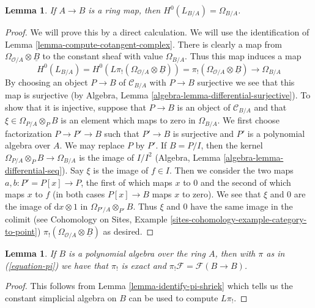 \documentclass[10pt,a4paper]{amsart}
\theoremstyle{plain}
\newtheorem{lemma}[subsection]{Lemma}
\theoremstyle{definition}
\theoremstyle{remark}
\numberwithin{equation}{subsection}
\begin{document}
\begin{lemma}
\label{lemma-identify-H0}
If $A \to B$ is a ring map, then $H^0(L_{B/A}) = \Omega_{B/A}$.
\end{lemma}

\begin{proof}
We will prove this by a direct calculation.
We will use the identification of Lemma \ref{lemma-compute-cotangent-complex}.
There is clearly a map from $\Omega_{\mathcal{O}/A} \otimes \underline{B}$
to the constant sheaf with value $\Omega_{B/A}$. Thus this map induces
a map
$$
H^0(L_{B/A}) = H^0(L\pi_!(\Omega_{\mathcal{O}/A} \otimes \underline{B}))
= \pi_!(\Omega_{\mathcal{O}/A} \otimes \underline{B}) \to \Omega_{B/A}
$$
By choosing an object $P \to B$ of $\mathcal{C}_{B/A}$ with $P \to B$
surjective we see that this map is surjective (by
Algebra, Lemma \ref{algebra-lemma-differential-surjective}).
To show that it is injective, suppose that $P \to B$ is an object
of $\mathcal{C}_{B/A}$ and that $\xi \in \Omega_{P/A} \otimes_P B$
is an element which maps to zero in $\Omega_{B/A}$.
We first choose factorization $P \to P' \to B$ such that $P' \to B$
is surjective and $P'$ is a polynomial algebra over $A$.
We may replace $P$ by $P'$. If $B = P/I$, then the kernel
$\Omega_{P/A} \otimes_P B \to \Omega_{B/A}$ is the image of
$I/I^2$ (Algebra, Lemma \ref{algebra-lemma-differential-seq}).
Say $\xi$ is the image of $f \in I$.
Then we consider the two maps $a, b : P' = P[x] \to P$, the first of which
maps $x$ to $0$ and the second of which maps $x$ to $f$ (in both
cases $P[x] \to B$ maps $x$ to zero). We see that $\xi$ and $0$
are the image of $\text{d}x \otimes 1$ in $\Omega_{P'/A} \otimes_{P'} B$.
Thus $\xi$ and $0$ have the same image in the colimit (see
Cohomology on Sites, Example \ref{sites-cohomology-example-category-to-point})
$\pi_!(\Omega_{\mathcal{O}/A} \otimes \underline{B})$ as desired.
\end{proof}

\begin{lemma}
\label{lemma-pi-lower-shriek-polynomial-algebra}
If $B$ is a polynomial algebra over the ring $A$, then
with $\pi$ as in (\ref{equation-pi}) we have that
$\pi_!$ is exact and $\pi_!\mathcal{F} = \mathcal{F}(B \to B)$.
\end{lemma}

\begin{proof}
This follows from Lemma \ref{lemma-identify-pi-shriek} which tells us
the constant simplicial algebra on $B$ can be used to compute $L\pi_!$.
\end{proof}
\end{document}
